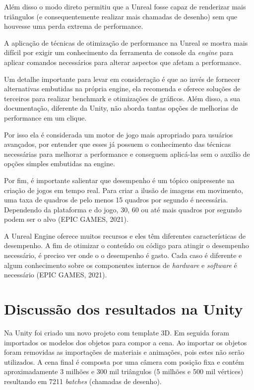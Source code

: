 Além disso o modo direto permitiu que a Unreal fosse capaz de renderizar mais triângulos (e consequentemente realizar mais chamadas de desenho) sem que houvesse uma perda extrema de performance.

A aplicação de técnicas de otimização de performance na Unreal se mostra mais difícil por exigir um conhecimento da ferramenta de console da \textit{engine} para aplicar comandos necessários para alterar aspectos que afetam a performance.

Um detalhe importante para levar em consideração é que ao invés de fornecer alternativas embutidas na própria engine, ela recomenda e oferece soluções de terceiros para realizar benchmark e otimizações de gráficos. Além disso, a sua documentação, diferente da Unity, não aborda tantas opções de melhorias de performance em um clique. 

Por isso ela é considerada um motor de jogo mais apropriado para usuários avançados, por entender que esses já possuem o conhecimento das técnicas necessárias para melhorar a performance e conseguem aplicá-las sem o auxilio de opções simples embutidas na engine.

Por fim, é importante salientar que desempenho é um tópico onipresente na criação de jogos em tempo real. Para criar a ilusão de imagens em movimento, uma taxa de quadros de pelo menos 15 quadros por segundo é necessária. Dependendo da plataforma e do jogo, 30, 60 ou até mais quadros por segundo podem ser o alvo (EPIC GAMES, 2021).

A Unreal Engine oferece muitos recursos e eles têm diferentes características de desempenho. A fim de otimizar o conteúdo ou código para atingir o desempenho necessário, é preciso ver onde o o desempenho é gasto. Cada caso é diferente e algum conhecimento sobre os componentes internos de \textit{hardware} e \textit{software} é necessário (EPIC GAMES, 2021). 


\section{Discussão dos resultados na Unity}
\label{sec:resultado-unity}

Na Unity foi criado um novo projeto com template 3D. Em seguida foram importados os modelos dos objetos para compor a cena. Ao importar os objetos foram removidas as importações de materiais e animações, pois estes não serão utilizados. A cena final é composta por uma câmera com posição fixa e contém aproximadamente 3 milhões e 300 mil triângulos (5 milhões e 500 mil vértices) resultando em 7211 \textit{batches} (chamadas de desenho).

